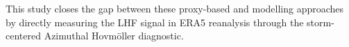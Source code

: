 This study closes the gap between these proxy-based and modelling
approaches by directly measuring the LHF signal in ERA5 reanalysis
through the storm-centered Azimuthal Hovm\"{o}ller diagnostic.

%
%
%
%

